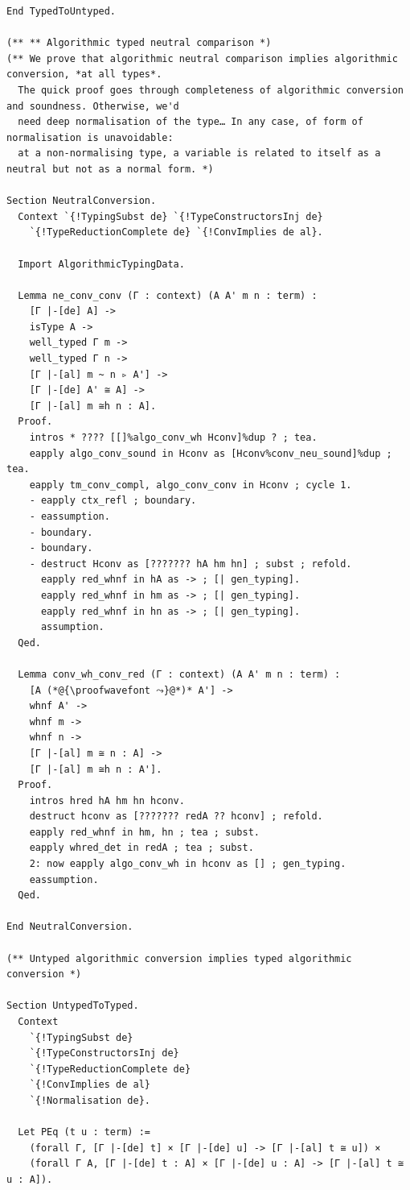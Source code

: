 \documentclass[10pt,a4paper]{amsart}
\begin{document}
\begin{lstlisting}
End TypedToUntyped.

(** ** Algorithmic typed neutral comparison *)
(** We prove that algorithmic neutral comparison implies algorithmic conversion, *at all types*.
  The quick proof goes through completeness of algorithmic conversion and soundness. Otherwise, we'd
  need deep normalisation of the type… In any case, of form of normalisation is unavoidable:
  at a non-normalising type, a variable is related to itself as a neutral but not as a normal form. *)

Section NeutralConversion.
  Context `{!TypingSubst de} `{!TypeConstructorsInj de}
    `{!TypeReductionComplete de} `{!ConvImplies de al}.

  Import AlgorithmicTypingData.
  
  Lemma ne_conv_conv (Γ : context) (A A' m n : term) :
    [Γ |-[de] A] ->
    isType A ->
    well_typed Γ m ->
    well_typed Γ n ->
    [Γ |-[al] m ~ n ▹ A'] ->
    [Γ |-[de] A' ≅ A] ->
    [Γ |-[al] m ≅h n : A].
  Proof.
    intros * ???? [[]%algo_conv_wh Hconv]%dup ? ; tea.
    eapply algo_conv_sound in Hconv as [Hconv%conv_neu_sound]%dup ; tea.
    eapply tm_conv_compl, algo_conv_conv in Hconv ; cycle 1.
    - eapply ctx_refl ; boundary.
    - eassumption.
    - boundary.
    - boundary.
    - destruct Hconv as [??????? hA hm hn] ; subst ; refold.
      eapply red_whnf in hA as -> ; [| gen_typing].
      eapply red_whnf in hm as -> ; [| gen_typing].
      eapply red_whnf in hn as -> ; [| gen_typing].
      assumption.
  Qed.

  Lemma conv_wh_conv_red (Γ : context) (A A' m n : term) :
    [A (*@{\proofwavefont ⤳}@*)* A'] ->
    whnf A' ->
    whnf m ->
    whnf n ->
    [Γ |-[al] m ≅ n : A] ->
    [Γ |-[al] m ≅h n : A'].
  Proof.
    intros hred hA hm hn hconv.
    destruct hconv as [??????? redA ?? hconv] ; refold.
    eapply red_whnf in hm, hn ; tea ; subst.
    eapply whred_det in redA ; tea ; subst.
    2: now eapply algo_conv_wh in hconv as [] ; gen_typing.
    eassumption.
  Qed.

End NeutralConversion.

(** Untyped algorithmic conversion implies typed algorithmic conversion *)

Section UntypedToTyped.
  Context
    `{!TypingSubst de}
    `{!TypeConstructorsInj de}
    `{!TypeReductionComplete de}
    `{!ConvImplies de al}
    `{!Normalisation de}.

  Let PEq (t u : term) :=
    (forall Γ, [Γ |-[de] t] × [Γ |-[de] u] -> [Γ |-[al] t ≅ u]) ×
    (forall Γ A, [Γ |-[de] t : A] × [Γ |-[de] u : A] -> [Γ |-[al] t ≅ u : A]).


\end{lstlisting}
\end{document}
